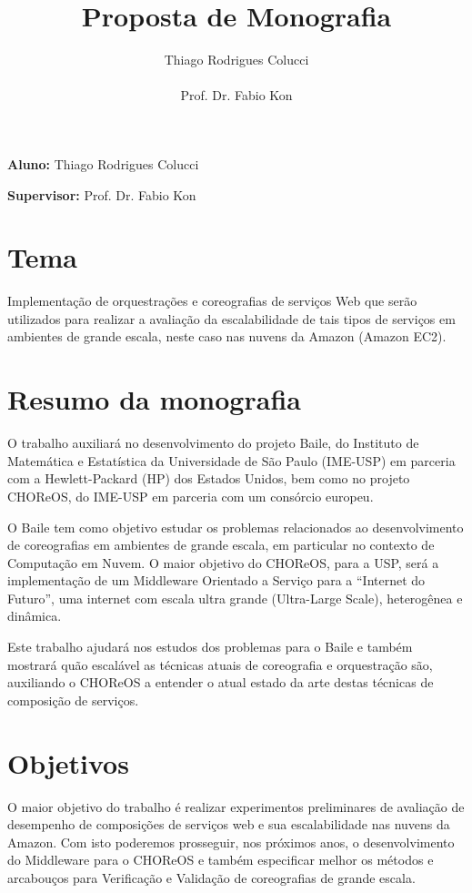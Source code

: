 \documentclass[11pt,a4paper]{article}
\title{Proposta de Monografia}
\author{Thiago Rodrigues Colucci\\\\Prof. Dr. Fabio Kon}
\begin{document}
\maketitle

\newpage

\tableofcontents
\newpage
\textbf{Aluno:} Thiago Rodrigues Colucci

\textbf{Supervisor:} Prof. Dr. Fabio Kon

\section{Tema}
Implementação de orquestrações e coreografias de serviços Web que serão utilizados para realizar a avaliação da escalabilidade de tais tipos de serviços em ambientes de grande escala, neste caso nas nuvens da Amazon (Amazon EC2).

\section{Resumo da monografia}
O trabalho auxiliará no desenvolvimento do projeto Baile, do Instituto de Matemática e Estatística da Universidade de São Paulo (IME-USP) em parceria com a Hewlett-Packard (HP) dos Estados Unidos, bem como no projeto CHOReOS, do IME-USP em parceria com um consórcio europeu. 

O Baile tem como objetivo estudar os problemas relacionados ao desenvolvimento de coreografias em ambientes de grande escala, em particular no contexto de Computação em Nuvem. O maior objetivo do CHOReOS, para a USP, será a implementação de um Middleware Orientado a Serviço para a ``Internet do Futuro'', uma internet com escala ultra grande (Ultra-Large Scale), heterogênea e dinâmica. 

Este trabalho ajudará nos estudos dos problemas para o Baile e também mostrará quão escalável as técnicas atuais de coreografia e orquestração são, auxiliando o CHOReOS a entender o atual estado da arte destas técnicas de composição de serviços.

\section{Objetivos}
O maior objetivo do trabalho é realizar experimentos preliminares de avaliação de desempenho de composições de serviços web e sua escalabilidade nas nuvens da Amazon. Com isto poderemos prosseguir, nos próximos anos, o desenvolvimento do Middleware para o CHOReOS e também especificar melhor os métodos e arcabouços para Verificação e Validação de coreografias de grande escala.
\end{document}
